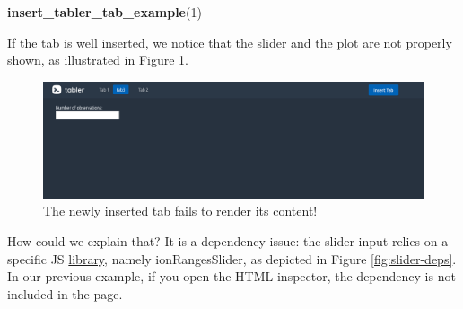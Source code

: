 \documentclass[
]{book}
\newenvironment{Shaded}{\begin{snugshade}}{\end{snugshade}}
\newcommand{\AttributeTok}[1]{\textcolor[rgb]{0.77,0.63,0.00}{#1}}
\newcommand{\CommentTok}[1]{\textcolor[rgb]{0.56,0.35,0.01}{\textit{#1}}}
\newcommand{\ControlFlowTok}[1]{\textcolor[rgb]{0.13,0.29,0.53}{\textbf{#1}}}
\newcommand{\DecValTok}[1]{\textcolor[rgb]{0.00,0.00,0.81}{#1}}
\newcommand{\KeywordTok}[1]{\textcolor[rgb]{0.13,0.29,0.53}{\textbf{#1}}}
\newcommand{\NormalTok}[1]{#1}
\newcommand{\OperatorTok}[1]{\textcolor[rgb]{0.81,0.36,0.00}{\textbf{#1}}}
\newcommand{\StringTok}[1]{\textcolor[rgb]{0.31,0.60,0.02}{#1}}
\newcommand{\VariableTok}[1]{\textcolor[rgb]{0.00,0.00,0.00}{#1}}
\begin{document}
\begin{Shaded}
\end{Shaded}

\begin{Shaded}
\begin{Highlighting}[]
\KeywordTok{insert_tabler_tab_example}\NormalTok{(}\DecValTok{1}\NormalTok{)}
\end{Highlighting}
\end{Shaded}

If the tab is well inserted, we notice that the slider and the plot are not properly shown, as illustrated in Figure \ref{fig:tabler-insert-tab-fail}.

\begin{figure}
\includegraphics[width=14.99in]{images/practice/tabler-insert-tab-fail} \caption{The newly inserted tab fails to render its content!}\label{fig:tabler-insert-tab-fail}
\end{figure}

How could we explain that? It is a dependency issue: the slider input relies on a specific JS \href{http://ionden.com/a/plugins/ion.rangeSlider/}{library}, namely ionRangesSlider, as depicted in Figure \ref{fig:slider-deps}. In our previous example, if you open the HTML inspector, the dependency is not included in the page.
\end{document}
